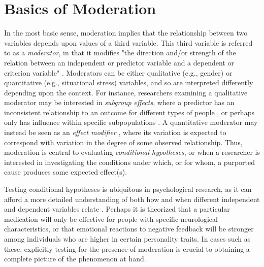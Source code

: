 \section{Basics of Moderation}
In the most basic sense, moderation implies that the relationship between two variables depends upon values of a third variable. This third variable is referred to as a \textit{moderator}, in that it modifies "the direction and/or strength of the relation between an independent or predictor variable and a dependent or criterion variable" \cite[1174]{baron1986moderator}. Moderators can be either qualitative (e.g., gender) or quantitative (e.g., situational stress) variables, and so are interpreted differently depending upon the context. For instance, researchers examining a qualitative moderator may be interested in \textit{subgroup effects}, where a predictor has an inconsistent relationship to an outcome for different types of people \cite{hall2013mediation}, or perhaps only has influence within specific subpopulations \cite{brambor2006understanding}. A quantitative moderator may instead be seen as an \textit{effect modifier} \cite{hinshaw2002intervention}, where its variation is expected to correspond with variation in the degree of some observed relationship. Thus, moderation is central to evaluating \textit{conditional hypotheses}, or when a researcher is interested in investigating the conditions under which, or for whom, a purported cause produces some expected effect(s). 

Testing conditional hypotheses is ubiquitous in psychological research, as it can afford a more detailed understanding of both how and when different independent and dependent variables relate \cite{baron1986moderator}. Perhaps it is theorized that a particular medication will only be effective for people with specific neurological characteristics, or that emotional reactions to negative feedback will be stronger among individuals who are higher in certain personality traits. In cases such as these, explicitly testing for the presence of moderation is crucial to obtaining a complete picture of the phenomenon at hand. 

